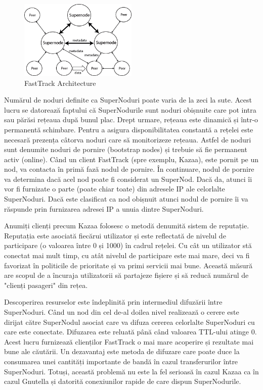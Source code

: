 \begin{figure}
  \centering
  \includegraphics[width=0.5\textwidth]{src/img/p2p-systems/fasttrack}
  \caption{FastTrack Architecture}
  \label{fig:p2p-systems:fasttrack}
\end{figure}

Numărul de noduri definite ca SuperNoduri poate varia de la zeci la sute.
Acest lucru se datorează faptului că SuperNodurile sunt noduri obișnuite care
pot intra sau părăsi rețeaua după bunul plac. Drept urmare, rețeaua este
dinamică și într-o permanentă schimbare. Pentru a asigura disponibilitatea
constantă a rețelei este necesară prezența câtorva noduri care să monitorizeze
rețeaua. Astfel de noduri sunt denumite noduri de pornire (bootstrap nodes) și
trebuie să fie permanent activ (online). Când un client FastTrack (spre
exemplu, Kazaa), este pornit pe un nod, va contacta în primă fază nodul de
pornire. În continuare, nodul de pornire va determina dacă acel nod poate fi
considerat un SuperNod. Dacă da, atunci îi vor fi furnizate o parte (poate
chiar toate) din adresele IP ale celorlalte SuperNoduri. Dacă este clasificat
ca nod obișnuit atunci nodul de pornire îi va răspunde prin furnizarea adresei
IP a unuia dintre SuperNoduri.

Anumiți clienți precum Kazaa folosesc o metodă denumită sistem de reputație.
Reputația este asociată fiecărui utilizator și este reflectată de nivelul de
participare (o valoarea între 0 și 1000) în cadrul rețelei. Cu cât un
utilizator stă conectat mai mult timp, cu atât nivelul de participare este mai
mare, deci va fi favorizat în politicile de prioritate și va primi servicii
mai bune. Această măsură are scopul de a încuraja utilizatorii să partajeze
fișiere și să reducă numărul de "clienți pasageri" din rețea.

Descoperirea resurselor este îndeplinită prin intermediul difuzării între
SuperNoduri. Când un nod din cel de-al doilea nivel realizează o cerere este
dirijat către SuperNodul asociat care va difuza cererea celorlalte SuperNoduri
cu care este conectate. Difuzarea este reluată până când valoarea TTL-ului
atinge 0. Acest lucru furnizează clienților FastTrack o mai mare acoperire și
rezultate mai bune ale căutării. Un dezavantaj este metoda de difuzare care
poate duce la consumarea unei cantități importante de bandă în cazul
transferurilor între SuperNoduri. Totuși, această problemă nu este la fel
serioasă în cazul Kazaa ca în cazul Gnutella și datorită conexiunilor rapide
de care dispun SuperNodurile.

